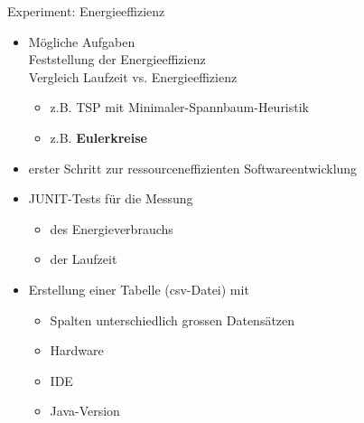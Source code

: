 \begin{frame}{Experiment: Energieeffizienz}
\begin{itemize}
	\item Mögliche Aufgaben\\
	      Feststellung der Energieeffizienz\\
				Vergleich Laufzeit vs. Energieeffizienz
\begin{itemize}
	\item z.B. TSP mit Minimaler-Spannbaum-Heuristik
	\item z.B. \textbf<2->{Eulerkreise}
\end{itemize}
	\item erster Schritt zur ressourceneffizienten Softwareentwicklung 
	\item JUNIT-Tests für die Messung 
	\begin{itemize}
		\item  des Energieverbrauchs
		\item  der Laufzeit
\end{itemize}
	\item Erstellung einer Tabelle  (csv-Datei)  mit
	\begin{itemize}
		\item Spalten unterschiedlich grossen Datensätzen
		\item Hardware
		\item IDE
		\item Java-Version
			
\end{itemize}
\end{itemize} 
\end{frame}

